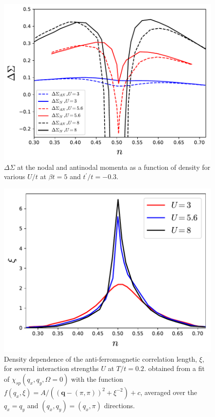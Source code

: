 \documentclass[twocolumn,notitlepage,prb,superscriptaddress,showpacs]{revtex4-1}
\begin{document}
\begin{figure}
\centering
    \includegraphics[width=0.95\linewidth]{deltasigma_all.pdf}
\caption{ $\Delta \Sigma$ at the nodal and antinodal momenta as a function of density for various $U/t$ at $\beta t=5$ and $t^\prime /t=-0.3$.  \label{fig:deltasigmal}}
\end{figure} 

\begin{figure}
\centering
    \includegraphics[width=0.9\linewidth]{density_cor.pdf}
        \caption{\label{fig:corlengthdoping}Density dependence of the anti-ferromagnetic correlation length, $\xi$, for several interaction strengths $U$ at $T/t=0.2$. obtained from a fit of $\chi_{sp}(q_x,q_y,\Omega=0)$ with the function $f(q_x,\xi)=A/((\mathbf{q}-(\pi,\pi))^2+\xi^{-2}) +c $, averaged over the $q_x=q_y$ and $(q_x,q_y)=(q_x,\pi)$ directions.\cite{rohringer:2016,gukelberger:2017}}
\end{figure}
\end{document}
